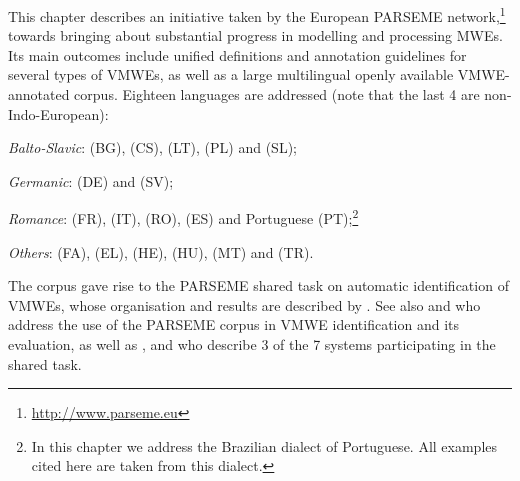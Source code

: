 \documentclass[output=paper,
modfonts,
]{langscibook}
\begin{document}
This chapter describes an initiative taken by the European PARSEME net\-work,\footnote{{\scriptsize  \url{http://www.parseme.eu}}} towards bringing about substantial progress in modelling and processing MWEs. Its main outcomes include unified definitions and annotation guidelines for several types of VMWEs, as well as a large multilingual openly available VMWE-annotated corpus. Eighteen languages are addressed (note that the last 4 are non-Indo-European): 
\begin{sitem}
\item\label{language-groups}
\textit{Balto-Slavic}:  (BG),  (CS),  (LT),  (PL) and  (SL);
\item
\textit{Germanic}:  (DE) and  (SV); 
\item
\textit{Romance}:  (FR),  (IT),  (RO),  (ES) and Portuguese (PT);\footnote{In this chapter we address the Brazilian dialect of Portuguese. All examples cited here are taken from this dialect.}
\item
\textit{Others}:  (FA),  (EL),  (HE),  (HU),  (MT) and  (TR).
 \end{sitem}
The corpus gave rise to the PARSEME shared task on automatic identification of VMWEs, whose organisation and results are described by \citet{MWEWorkshop}. See also  and  who address the use of the PARSEME corpus in VMWE identification and its evaluation, as well as ,  and  who  describe 3 of the 7 systems participating in the shared task.
 
\end{document}

